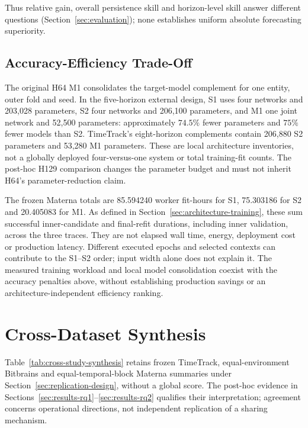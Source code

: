 \documentclass[a4paper,fleqn]{cas-dc}
\begin{document}
Thus relative gain, overall persistence skill and horizon-level skill answer
different questions (Section~\ref{sec:evaluation}); none establishes uniform
absolute forecasting superiority.

\subsection{Accuracy-Efficiency Trade-Off}
\label{sec:results-efficiency}

The original H64 M1 consolidates the target-model complement for one entity,
outer fold and seed. In the five-horizon external design, S1 uses four
networks and 203,028 parameters, S2 four networks and 206,100 parameters, and
M1 one joint network and 52,500 parameters: approximately $74.5\%$ fewer
parameters and $75\%$ fewer models than S2. TimeTrack's eight-horizon
complements contain 206,880 S2 parameters and 53,280 M1 parameters. These
are local architecture inventories, not a globally deployed four-versus-one
system or total training-fit counts. The post-hoc H129 comparison changes
the parameter budget and must not inherit H64's parameter-reduction claim.



The frozen Materna totals are 85.594240 worker fit-hours for S1, 75.303186 for
S2 and 20.405083 for M1. As defined in Section~\ref{sec:architecture-training},
these sum successful inner-candidate and final-refit durations, including
inner validation, across the three traces. They are not elapsed wall time,
energy, deployment cost or production latency. Different executed epochs and
selected contexts can contribute to the S1--S2 order; input width alone does
not explain it. The measured training workload and local model consolidation
coexist with the accuracy penalties above, without establishing production
savings or an architecture-independent efficiency ranking.

\section{Cross-Dataset Synthesis}
\label{sec:cross-dataset-synthesis}

Table~\ref{tab:cross-study-synthesis} retains frozen TimeTrack,
equal-environment Bitbrains and equal-temporal-block Materna summaries under
Section~\ref{sec:replication-design}, without a global score.
The post-hoc evidence in Sections~\ref{sec:results-rq1}--\ref{sec:results-rq2}
qualifies their interpretation; agreement concerns operational directions,
not independent replication of a sharing mechanism.
\end{document}

